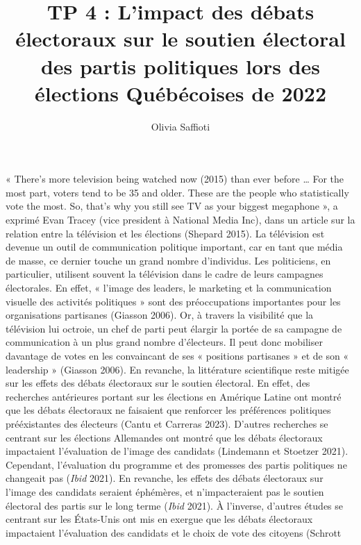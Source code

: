 \documentclass[
  letterpaper,
  DIV=11,
  numbers=noendperiod]{scrartcl}
\title{TP 4 : L'impact des débats électoraux sur le soutien électoral
des partis politiques lors des élections Québécoises de 2022}
\author{Olivia Saffioti}
\date{}
\begin{document}
\maketitle
\ifdefined\Shaded\renewenvironment{Shaded}{\begin{tcolorbox}[enhanced, boxrule=0pt, sharp corners, frame hidden, breakable, interior hidden, borderline west={3pt}{0pt}{shadecolor}]}{\end{tcolorbox}}\fi

« There's more television being watched now (2015) than ever before
\ldots{} For the most part, voters tend to be 35 and older. These are
the people who statistically vote the most. So, that's why you still see
TV as your biggest megaphone », a exprimé Evan Tracey (vice president à
National Media Inc), dans un article sur la relation entre la télévision
et les élections (Shepard 2015). La télévision est devenue un outil de
communication politique important, car en tant que média de masse, ce
dernier touche un grand nombre d'individus. Les politiciens, en
particulier, utilisent souvent la télévision dans le cadre de leurs
campagnes électorales. En effet, « l'image des leaders, le marketing et
la communication visuelle des activités politiques » sont des
préoccupations importantes pour les organisations partisanes (Giasson
2006). Or, à travers la visibilité que la télévision lui octroie, un
chef de parti peut élargir la portée de sa campagne de communication à
un plus grand nombre d'électeurs. Il peut donc mobiliser davantage de
votes en les convaincant de ses « positions partisanes » et de son «
leadership » (Giasson 2006). En revanche, la littérature scientifique
reste mitigée sur les effets des débats électoraux sur le soutien
électoral. En effet, des recherches antérieures portant sur les
élections en Amérique Latine ont montré que les débats électoraux ne
faisaient que renforcer les préférences politiques prééxistantes des
électeurs (Cantu et Carreras 2023). D'autres recherches se centrant sur
les élections Allemandes ont montré que les débats électoraux
impactaient l'évaluation de l'image des candidats (Lindemann et Stoetzer
2021). Cependant, l'évaluation du programme et des promesses des partis
politiques ne changeait pas (\emph{Ibid} 2021). En revanche, les effets
des débats électoraux sur l'image des candidats seraient éphémères, et
n'impacteraient pas le soutien électoral des partis sur le long terme
(\emph{Ibid} 2021). À l'inverse, d'autres études se centrant sur les
États-Unis ont mis en exergue que les débats électoraux impactaient
l'évaluation des candidats et le choix de vote des citoyens (Schrott
\end{document}
